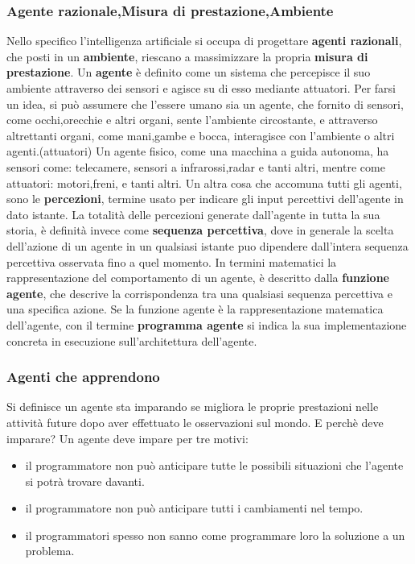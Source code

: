 \documentclass[14pt]{extarticle}
\begin{document}
\begin{itemize}
\subsubsection{Agente razionale,Misura di prestazione,Ambiente}

Nello specifico l'intelligenza artificiale si occupa di progettare \textbf{agenti razionali}, che posti in un \textbf{ambiente}, riescano a massimizzare la propria \textbf{misura di prestazione}.\cite{russell2005intelligenza}
Un \textbf{agente} è definito  come un sistema che percepisce il suo ambiente attraverso dei sensori e agisce su di esso mediante attuatori. Per farsi un idea, si può assumere che l'essere umano sia un agente, che fornito di sensori, come occhi,orecchie e altri organi, sente l'ambiente circostante, e attraverso altrettanti organi, come mani,gambe e bocca, interagisce con l'ambiente o altri agenti.(attuatori)
Un agente fisico, come una macchina a guida autonoma, ha sensori come: telecamere, sensori a infrarossi,radar e tanti altri, mentre come attuatori: motori,freni, e tanti altri. 
Un altra cosa che accomuna tutti gli agenti, sono le  \textbf{percezioni}, termine usato per indicare gli input percettivi dell'agente in dato istante.\cite{russell2005intelligenza}
La totalità delle percezioni generate dall'agente in tutta la sua storia, è definità invece come \textbf{sequenza percettiva}, dove in generale la scelta dell'azione di un agente in un qualsiasi istante puo dipendere dall'intera sequenza percettiva osservata fino a quel momento.
In termini matematici la rappresentazione del comportamento di un agente, è descritto dalla \textbf{funzione agente}, che descrive la corrispondenza tra una qualsiasi sequenza percettiva e una specifica azione.
Se la funzione agente è la rappresentazione matematica dell'agente, con il termine \textbf{programma agente} si indica la sua implementazione concreta  in  esecuzione sull'architettura dell'agente.  \cite{russell2005intelligenza}
\subsubsection{Agenti che apprendono}
Si definisce un agente sta imparando se migliora le proprie prestazioni nelle attività future dopo aver effettuato le osservazioni
sul mondo. \cite{russell2005intelligenza}
E perchè deve imparare?
Un agente deve impare per tre motivi:
\begin{itemize}
\item  il programmatore non può anticipare tutte le possibili situazioni che l'agente si potrà trovare davanti.
\item il programmatore non può anticipare tutti i cambiamenti nel tempo.
\item il programmatori spesso non sanno come programmare loro la soluzione a un problema.
\end{itemize}\cite{russell2005intelligenza}


\end{itemize}
\end{document}
